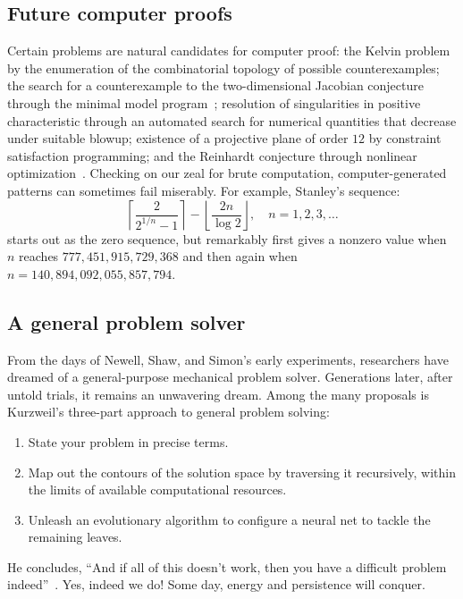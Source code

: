 \documentclass{llncs}
\begin{document}
\subsection{Future computer proofs}

Certain problems are natural candidates for computer proof: the Kelvin
problem by the enumeration of the combinatorial topology of possible
counterexamples; the search for a counterexample to the
two-dimensional Jacobian conjecture through the minimal model
program~\cite{Borisov}; resolution of singularities in positive
characteristic through an automated search for numerical quantities
that decrease under suitable blowup; existence of a projective plane
of order $12$ by constraint satisfaction programming; and the
Reinhardt conjecture through nonlinear optimization~\cite{XX
  Rein. Hales}.  Checking on our zeal for brute computation,
computer-generated patterns can sometimes fail miserably.  For
example, Stanley's sequence:
\[
\left\lceil{\frac{2}{2^{1/n} - 1}}\right\rceil- \left\lfloor{\frac{2 n}{\log 2}}\right\rfloor,\quad n=1,2,3,\ldots
\]
starts out as the zero sequence, but remarkably first gives a nonzero
value when $n$ reaches $777,451,915,729,368$ and then again
when $n=140,894,092,055,857,794$.

\subsection{A general problem solver}

From the days of Newell, Shaw, and Simon's early experiments, researchers
have dreamed of a general-purpose mechanical problem solver.  Generations later,
after untold trials, it remains an unwavering dream.  Among the many
proposals is Kurzweil's three-part approach to general problem solving:
\begin{enumerate} 
\item State your problem in precise terms.
\item Map out the contours of the solution space by traversing it
  recursively, within the limits of available computational resources.
\item Unleash an evolutionary algorithm to configure a neural net to
  tackle the remaining leaves.
\end{enumerate}
He concludes, ``And if all of this doesn't work, then you have a
difficult problem indeed''~\cite{Ku99}.  Yes, indeed we do!  Some day,
energy and persistence will conquer.
\end{document}
